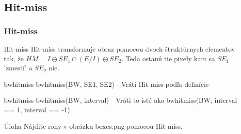 \documentclass{beamer}
\begin{document}
\subsection{Hit-miss}
\begin{frame}
\frametitle{Hit-miss}
  \begin{block}{Hit-miss}
  Hit-miss transformuje obraz pomocou dvoch štruktúrnych elementov tak, že $HM = I \ominus SE_1 \cap (E / I) \ominus SE_2$. Teda ostanú tie pixely kam sa $SE_1$ 'zmestí' a $SE_2$ nie.
  \end{block}    
  
  \begin{block}{bwhitmiss}
  bwhitmiss(BW, SE1, SE2) - Vráti Hit-miss podľa definície
  \end{block}   
  
  \begin{block}{bwhitmiss}
  bwhitmiss(BW, interval) - Vráti to isté ako bwhitmiss(BW, interval == 1, interval == -1)
  \end{block}   
  
  \begin{block}{Úloha}
  Nájdite rohy v obrázku boxes.png pomocou Hit-miss.
  \end{block}   
  
   
\end{frame}
\end{document}
